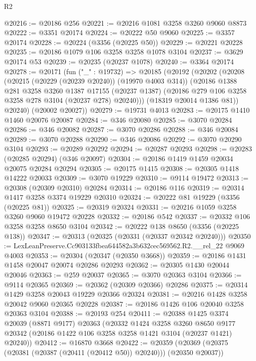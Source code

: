 \begin{lexlean}{R2}
\begin{coremodule}
@20216 := @20186 @256
@20221 := @20216 @1081 @3258 @3260 @9060 @8873
@20222 := @3351 @20174
@20224 := @20222 @50 @9060
@20225 := @3357 @20174
@20228 := @20224 (@3356 (@20225 @50))
@20229 := @20221 @20228
@20235 := @20186 @1079 @106 @3258 @3258 @1078 @3104
@20237 := @3629 @20174 @53
@20239 := @20235 (@20237 @1078)
@20240 := @3364 @20174
@20278 := @20171
    (fun ("_" : @19732) =>
    @20185
      (@20192
        (@20202
          (@20208
            (@20215 (@20229 (@20239 @20240)) (@19970 @4003 @314))
            (@20186
              @1388
              @281
              @3258
              @3260
              @1387
              @17155
              (@20237 @1387)
              (@20186 @279 @106 @3258 @3258 @278 @3104 (@20237 @278) @20240)))
          (@18319 @20014 @1386 @81))
        @20240)
      (@20002 @20027))
@20279 := @19731 @4013
@20283 := @20175 @1410 @1460 @20076 @20087
@20284 := @346 @20080
@20285 := @3070 @20284
@20286 := @346 @20082
@20287 := @3070 @20286
@20288 := @346 @20084
@20289 := @3070 @20288
@20290 := @346 @20086
@20292 := @3070 @20290 @3104
@20293 := @20289 @20292
@20294 := @20287 @20293
@20298 := @20283 (@20285 @20294) (@346 @20097)
@20304 := @20186 @1419 @1459 @20034 @20075 @20284 @20294
@20305 := @20175 @1415
@20308 := @20305 @1418 @14222 @20033
@20309 := @3070 @19229
@20310 := @9114 @19472
@20313 := @20308 (@20309 @20310) @20284
@20314 := @20186 @116
@20319 := @20314 @1417 @3258 @3374 @19229 @20310
@20324 := @20222 @81 @19229 (@3356 (@20225 @81))
@20325 := @20319 @20324
@20331 := @20216 @1059 @3258 @3260 @9060 @19472 @20228
@20332 := @20186 @542
@20337 := @20332 @106 @3258 @3258 @8650 @3104
@20342 := @20222 @138 @8650 (@3356 (@20225 @138))
@20347 := @20313 (@20325 (@20331 (@20337 @20342 @20240)))
@20350 := LexLeanPreserve.Cc903133fbea644582a3b632cec569562.R2.__rel_22 @9069 @4003
@20353 := @20304 (@20347 (@20350 @3668))
@20359 := @20186 @1431 @1458 @20047 @20074 @20286 @20293
@20362 := @20305 @1430 @20044 @20046
@20363 := @259 @20037
@20365 := @3070 @20363 @3104
@20366 := @9114 @20365
@20369 := @20362 (@20309 @20366) @20286
@20375 := @20314 @1429 @3258 @20043 @19229 @20366 @20324
@20381 := @20216 @1428 @3258 @20042 @9060 @20365 @20228
@20387 := @20186 @1426 @106 @20040 @3258 @20363 @3104
@20388 := @20193 @254
@20411 := @20388
    @1425
    @3374
    @20039
    (@8871 @9177)
    @20363
    (@20332
      @1424
      @3258
      @3260
      @8650
      @9177
      @20342
      (@20186 @1422 @106 @3258 @3258 @1421 @3104 (@20237 @1421) @20240))
@20412 := @16870 @3668
@20422 := @20359 (@20369 (@20375 (@20381 (@20387 (@20411 (@20412 @50)) @20240))) (@20350 @20037))

\end{coremodule}
\end{lexlean}
